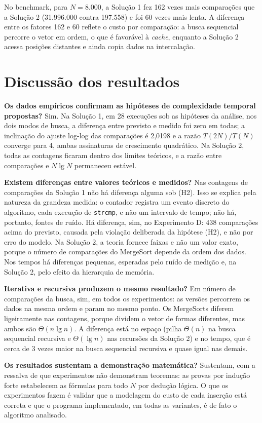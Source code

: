 \documentclass[11pt,a4paper]{article}
\begin{document}
No benchmark, para $N=8.000$, a Solução 1 fez 162 vezes mais comparações que a Solução 2 (31.996.000 contra 197.558) e foi 60 vezes mais lenta. A diferença entre os fatores 162 e 60 reflete o custo por comparação: a busca sequencial percorre o vetor em ordem, o que é favorável à \emph{cache}, enquanto a Solução 2 acessa posições distantes e ainda copia dados na intercalação.

\section{Discussão dos resultados}

\textbf{Os dados empíricos confirmam as hipóteses de complexidade temporal propostas?} Sim. Na Solução 1, em 28 execuções sob as hipóteses da análise, nos dois modos de busca, a diferença entre previsto e medido foi zero em todas; a inclinação do ajuste log-log das comparações é 2,0198 e a razão $T(2N)/T(N)$ converge para 4, ambas assinaturas de crescimento quadrático. Na Solução 2, todas as contagens ficaram dentro dos limites teóricos, e a razão entre comparações e $N\lg N$ permaneceu estável.

\textbf{Existem diferenças entre valores teóricos e medidos?} Nas contagens de comparações da Solução 1 não há diferença alguma sob (H2). Isso se explica pela natureza da grandeza medida: o contador registra um evento discreto do algoritmo, cada execução de \texttt{strcmp}, e não um intervalo de tempo; não há, portanto, fontes de ruído. Há diferença, sim, no Experimento D: 438 comparações acima do previsto, causada pela violação deliberada da hipótese (H2), e não por erro do modelo. Na Solução 2, a teoria fornece faixas e não um valor exato, porque o número de comparações do MergeSort depende da ordem dos dados. Nos tempos há diferenças pequenas, esperadas pelo ruído de medição e, na Solução 2, pelo efeito da hierarquia de memória.

\textbf{Iterativa e recursiva produzem o mesmo resultado?} Em número de comparações da busca, sim, em todos os experimentos: as versões percorrem os dados na mesma ordem e param no mesmo ponto. Os MergeSorts diferem ligeiramente nas contagens, porque dividem o vetor de formas diferentes, mas ambos são $\Theta(n\lg n)$. A diferença está no espaço (pilha $\Theta(n)$ na busca sequencial recursiva e $\Theta(\lg n)$ nas recursões da Solução 2) e no tempo, que é cerca de 3 vezes maior na busca sequencial recursiva e quase igual nas demais.

\textbf{Os resultados sustentam a demonstração matemática?} Sustentam, com a ressalva de que experimentos não demonstram teoremas: as provas por indução forte estabelecem as fórmulas para todo $N$ por dedução lógica. O que os experimentos fazem é validar que a modelagem do custo de cada inserção está correta e que o programa implementado, em todas as variantes, é de fato o algoritmo analisado.
\end{document}

